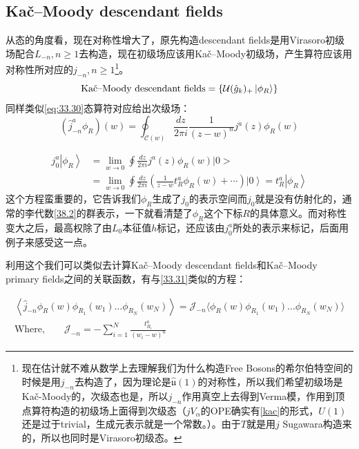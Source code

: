 \subsection{Ka\v{c}\mbox{–}Moody descendant fields}
从态的角度看，现在对称性增大了，原先构造descendant fields是用Virasoro初级场配合$L_{-n},n\geq 1$去构造，现在初级场应该用Ka\v{c}\mbox{–}Moody初级场，产生算符应该用对称性所对应的$j_{-n},n\geq 1$\footnote{现在估计就不难从数学上去理解我们为什么构造Free Bosons的希尔伯特空间的时候是用$j_{-n}$去构造了，因为理论是$\hat{\mathfrak{u}}(1)$的对称性，所以我们希望初级场是Ka\v{c}\mbox{-}Moody的，次级态也是，所以$j_{-n}$作用真空上去得到Verma模，作用到顶点算符构造的初级场上面得到次级态（$jV_\alpha$的OPE确实有\ref{kac}的形式，$U(1)$还是过于trivial，生成元表示就是一个常数。）。由于$T$就是用$j$ Sugawara构造来的，所以也同时是Virasoro初级态。}。
\[\text{Ka\v{c}\mbox{–}Moody descendant fields} = \{\mathcal{U}(\hat{g}_k)_+\ket{\phi_R}\}\]
同样类似\ref{eq:33.30}态算符对应给出次级场：
\begin{equation}
	\boxed{
		(\widehat{j}_{-n}^a\phi_R)(w)=\oint_{\mathcal{C}(w)}\frac{dz}{2\pi i}\frac1{(z-w)^n}j^a(z)\phi_R(w)
	}
\end{equation}
\begin{example}
	\begin{equation}
		\begin{aligned}
			j_0^a\left|\phi_R\right\rangle & =\lim\limits_{w\to0}\oint\frac{dz}{2\pi i}j^{a}(z)\phi_{R}(w)\big|0\big>  \\
			&=\lim_{w\to0}\oint\frac{dz}{2\pi i}\left(\frac1{z-w}t_R^a\phi_R(w)+\cdots\right)\left|0\right\rangle=t_R^a\left|\phi_R\right\rangle 
		\end{aligned}
	\end{equation}
	这个方程蛮重要的，它告诉我们$\phi_R$生成了$j_0$的表示空间而$j_0$就是没有仿射化的，通常的李代数\ref{38.2}的群表示，一下就看清楚了$\phi_R$这个下标$R$的具体意义。而对称性变大之后，最高权除了由$L_0$本征值$h$标记，还应该由$j_0^a$所处的表示来标记，后面用例子来感受这一点。
\end{example}
利用这个我们可以类似去计算Ka\v{c}\mbox{–}Moody descendant fields和Ka\v{c}\mbox{–}Moody primary fields之间的关联函数，有与\ref{33.31}类似的方程：
\begin{theorem}
	\begin{equation}\label{38.15}
		\boxed{
			\begin{gathered}
				\left\langle\widehat{j}_{-n}\phi_R(w)\phi_{R_1}(w_{1})\ldots\phi_{R_N}(w_{N})\right\rangle=\mathcal{J}_{-n}\langle\phi_R(w)\phi_{R_1}(w_{1})\ldots\phi_{R_N}(w_{N})\rangle  \\
				\text{Where,}\qquad\mathcal{J}_{-n}=-\sum_{i=1}^N\frac{t^a_{R_i}}{(w_i-w)^n}
			\end{gathered}
		}
	\end{equation}
\end{theorem}

